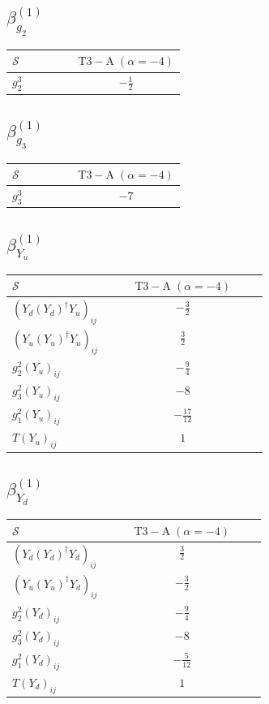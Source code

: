 \documentclass[9pt]{article}
\begin{document}
\subsection*{$ \beta_{g_2}^{(1)} $}
\begin{longtable}{@{}p{0.38\linewidth}c@{}}
\toprule
$\mathcal{S}$ & $ \mathrm{T3-A}\;(\alpha=-4) $ \\
\midrule
$ g_2^3 $ & $ - \frac{1}{2} $ \\
\bottomrule
\end{longtable}
\subsection*{$ \beta_{g_3}^{(1)} $}
\begin{longtable}{@{}p{0.38\linewidth}c@{}}
\toprule
$\mathcal{S}$ & $ \mathrm{T3-A}\;(\alpha=-4) $ \\
\midrule
$ g_3^3 $ & $ -7 $ \\
\bottomrule
\end{longtable}
\subsection*{$ \beta_{Y_u}^{(1)} $}
\begin{longtable}{@{}p{0.38\linewidth}c@{}}
\toprule
$\mathcal{S}$ & $ \mathrm{T3-A}\;(\alpha=-4) $ \\
\midrule
$ (Y_d (Y_d)^{\dagger} Y_u)_{ij} $ & $ - \frac{3}{2} $ \\
$ (Y_u (Y_u)^{\dagger} Y_u)_{ij} $ & $ \frac{3}{2} $ \\
$ g_2^2 (Y_u)_{ij} $ & $ - \frac{9}{4} $ \\
$ g_3^2 (Y_u)_{ij} $ & $ -8 $ \\
$ g_1^2 (Y_u)_{ij} $ & $ - \frac{17}{12} $ \\
$ T (Y_u)_{ij} $ & $ 1 $ \\
\bottomrule
\end{longtable}
\subsection*{$ \beta_{Y_d}^{(1)} $}
\begin{longtable}{@{}p{0.38\linewidth}c@{}}
\toprule
$\mathcal{S}$ & $ \mathrm{T3-A}\;(\alpha=-4) $ \\
\midrule
$ (Y_d (Y_d)^{\dagger} Y_d)_{ij} $ & $ \frac{3}{2} $ \\
$ (Y_u (Y_u)^{\dagger} Y_d)_{ij} $ & $ - \frac{3}{2} $ \\
$ g_2^2 (Y_d)_{ij} $ & $ - \frac{9}{4} $ \\
$ g_3^2 (Y_d)_{ij} $ & $ -8 $ \\
$ g_1^2 (Y_d)_{ij} $ & $ - \frac{5}{12} $ \\
$ T (Y_d)_{ij} $ & $ 1 $ \\
\bottomrule
\end{longtable}
\end{document}
